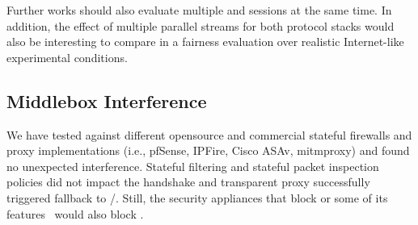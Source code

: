 Further works should also evaluate multiple \tcpls and
\quic sessions at the same time. In addition, the effect of multiple parallel
streams for both protocol stacks would also be interesting to compare in a
fairness evaluation over realistic Internet-like experimental conditions.





\subsection{Middlebox Interference}
\label{sec:middlebox}

We have tested \tcpls against different opensource and commercial stateful
firewalls and proxy implementations (i.e., pfSense, IPFire, Cisco ASAv,
mitmproxy) and found no unexpected interference. Stateful filtering and stateful
packet inspection policies did not impact the \tcpls handshake and transparent
\tls proxy successfully triggered \tcpls fallback to \tls/\tcp. Still, the security appliances that block  or some of its features~\cite{lee2019matls,Bock_China,raman2020measuring} would also block \tcpls.


